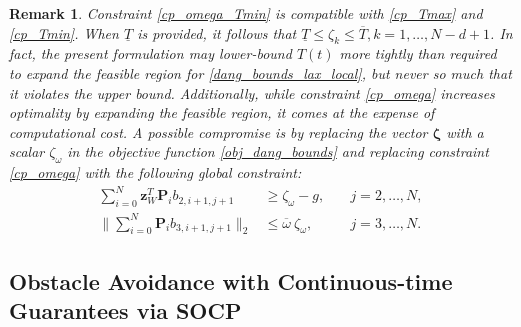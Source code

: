 \documentclass[journal,10pt]{IEEEtran}
\newtheorem{remark}{\bfseries Remark}
\newcommand{\vect}[1]{\boldsymbol{\mathbf{#1}}}
\newif\ifdraft
\newcommand{\XX}[1]{\ifdraft{\color{red}[{\bf XX}: #1]}\fi}
\newcommand{\VF}[1]{\ifdraft{\color{blue}[{\bf VF}: #1]}\fi}
\begin{document}
\begin{remark}
Constraint \eqref{cp_omega_Tmin} is compatible with \eqref{cp_Tmax} and \eqref{cp_Tmin}. When $\underline{T}$ is provided, it follows that $\underline{T} \leq \zeta_k \leq \overline{T}, k = 1,\dots,N-d+1$. In fact, the present formulation may lower-bound $T(t)$ more tightly than required to expand the feasible region for \eqref{dang_bounds_lax_local}, but never so much that it violates the upper bound. 
Additionally, while constraint \eqref{cp_omega} increases optimality by expanding the feasible region, it comes at the expense of computational cost. A possible compromise is by replacing the vector $\vect{\zeta}$ with a scalar $\zeta_\omega$ in the objective function \eqref{obj_dang_bounds} and replacing constraint \eqref{cp_omega} with the following global constraint: 
\begin{align*}
    \sum_{i=0}^N\vect{z}_W^T\vect{P}_ib_{2,i+1,j+1}&\geq \zeta_\omega-g, \quad &j= 2,\dots,N,\\
    \bigg\|\sum_{i=0}^N\vect{P}_ib_{3,i+1,j+1}\bigg\|_2 &\leq \overline{\omega}\ \zeta_{\omega}, \quad &j=3,\dots,N.
\end{align*}

\end{remark}


\subsection{Obstacle Avoidance with Continuous-time Guarantees via SOCP}\label{subavoidance}
\end{document}
